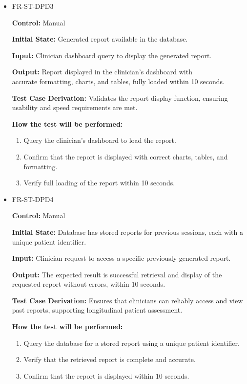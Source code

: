 \documentclass[12pt, titlepage]{article}
\begin{document}
\begin{itemize}
  \item FR-ST-DPD3
  \begin{mdframed}[linewidth=0.5mm]
      \textbf{Control:} Manual \par
      \textbf{Initial State:} Generated report available in the database. \par
      \textbf{Input:} Clinician dashboard query to display the generated report. \par
      \textbf{Output:} Report displayed in the clinician’s dashboard with \\accurate formatting, charts, and tables, fully loaded within 10 seconds. \par
      \textbf{Test Case Derivation:} Validates the report display function, ensuring usability and speed requirements are met. \par
      \textbf{How the test will be performed:}
      \begin{enumerate}[noitemsep]
        \item Query the clinician’s dashboard to load the report. 
        \item Confirm that the report is displayed with correct charts, tables, and formatting. 
        \item Verify full loading of the report within 10 seconds.
      \end{enumerate}
  \end{mdframed}

  \item FR-ST-DPD4
  \begin{mdframed}[linewidth=0.5mm]
      \textbf{Control:} Manual \par
      \textbf{Initial State:} Database has stored reports for previous sessions, each with a unique patient identifier. \par
      \textbf{Input:} Clinician request to access a specific previously generated report. \par
      \textbf{Output:} The expected result is successful retrieval and display of the requested report without errors, within 10 seconds. \par
      \textbf{Test Case Derivation:} Ensures that clinicians can reliably access and view past reports, supporting longitudinal patient assessment.\par
      \textbf{How the test will be performed:}
      \begin{enumerate}[noitemsep]
        \item Query the database for a stored report using a unique patient identifier. 
        \item Verify that the retrieved report is complete and accurate. 
        \item Confirm that the report is displayed within 10 seconds.
      \end{enumerate}
  \end{mdframed}

\end{itemize}
\end{document}
